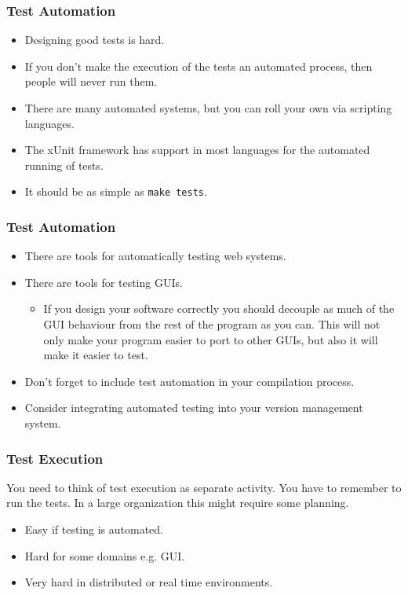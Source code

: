 \documentclass{beamer}
\begin{document}
\begin{frame}  
  \frametitle{Test Automation}
  \begin{itemize}
  \item Designing good tests is hard.
  \item If you don't make the execution of the tests an automated process, then
    people will never run them.
  \item There are many automated systems, but you can roll your own
    via scripting languages.   
  \item The xUnit framework has support in most languages for the
    automated running of tests. 
  \item It should be as simple as {\tt make tests}.
  \end{itemize}
\end{frame}
\begin{frame}
  \frametitle{Test Automation}
  \begin{itemize}
  \item There are tools for automatically testing web systems.
  \item There are tools for testing GUIs.
    \begin{itemize}
    \item If you design your software correctly you should decouple as
      much of the GUI behaviour from the rest of the program as you
      can. This will not only make your program easier to port to
      other GUIs, but also it will make it easier to test.
    \end{itemize}
  \item Don't forget to include test automation in your compilation
    process.
  \item Consider integrating automated testing into your version
    management system.  
  \end{itemize}
\end{frame}
\begin{frame}
  \frametitle{Test Execution}
You need to think of test execution as separate activity. You have to
remember to run the tests. In a large organization this might require
some planning.    
  \begin{itemize}
  \item Easy if testing is automated.
  \item Hard for some domains e.g. GUI.
  \item Very hard in distributed or real time environments.
  \end{itemize}
\end{frame}
\end{document}

